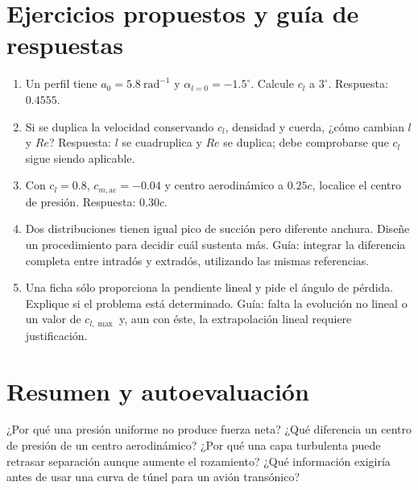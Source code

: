 \section{Ejercicios propuestos y guía de respuestas}
\begin{enumerate}
\item Un perfil tiene $a_0=5.8\ \mathrm{rad^{-1}}$ y $\alpha_{l=0}=-1.5^\circ$. Calcule $c_l$ a $3^\circ$. Respuesta: $0.4555$.
\item Si se duplica la velocidad conservando $c_l$, densidad y cuerda, ¿cómo cambian $l$ y $Re$? Respuesta: $l$ se cuadruplica y $Re$ se duplica; debe comprobarse que $c_l$ sigue siendo aplicable.
\item Con $c_l=0.8$, $c_{m,\mathrm{ac}}=-0.04$ y centro aerodinámico a $0.25c$, localice el centro de presión. Respuesta: $0.30c$.
\item Dos distribuciones tienen igual pico de succión pero diferente anchura. Diseñe un procedimiento para decidir cuál sustenta más. Guía: integrar la diferencia completa entre intradós y extradós, utilizando las mismas referencias.
\item Una ficha sólo proporciona la pendiente lineal y pide el ángulo de pérdida. Explique si el problema está determinado. Guía: falta la evolución no lineal o un valor de $c_{l,\max}$ y, aun con éste, la extrapolación lineal requiere justificación.
\end{enumerate}
\section{Resumen y autoevaluación}
¿Por qué una presión uniforme no produce fuerza neta? ¿Qué diferencia un centro de presión de un centro aerodinámico? ¿Por qué una capa turbulenta puede retrasar separación aunque aumente el rozamiento? ¿Qué información exigiría antes de usar una curva de túnel para un avión transónico?

